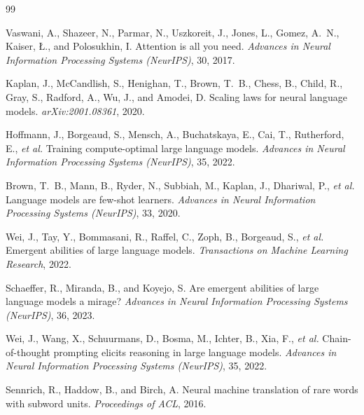 \documentclass[11pt,a4paper]{article}
\theoremstyle{definition}
\theoremstyle{plain}
\begin{document}
\newpage
\begin{thebibliography}{99}

  Vaswani, A., Shazeer, N., Parmar, N., Uszkoreit, J., Jones, L., Gomez, A.\ N.,
  Kaiser, \L., and Polosukhin, I.
  \newblock Attention is all you need.
  \newblock \textit{Advances in Neural Information Processing Systems (NeurIPS)}, 30, 2017.

  Kaplan, J., McCandlish, S., Henighan, T., Brown, T.\ B., Chess, B., Child, R.,
  Gray, S., Radford, A., Wu, J., and Amodei, D.
  \newblock Scaling laws for neural language models.
  \newblock \textit{arXiv:2001.08361}, 2020.

  Hoffmann, J., Borgeaud, S., Mensch, A., Buchatskaya, E., Cai, T., Rutherford, E.,
  \textit{et al.}
  \newblock Training compute-optimal large language models.
  \newblock \textit{Advances in Neural Information Processing Systems (NeurIPS)}, 35, 2022.

  Brown, T.\ B., Mann, B., Ryder, N., Subbiah, M., Kaplan, J., Dhariwal, P.,
  \textit{et al.}
  \newblock Language models are few-shot learners.
  \newblock \textit{Advances in Neural Information Processing Systems (NeurIPS)}, 33, 2020.

  Wei, J., Tay, Y., Bommasani, R., Raffel, C., Zoph, B., Borgeaud, S.,
  \textit{et al.}
  \newblock Emergent abilities of large language models.
  \newblock \textit{Transactions on Machine Learning Research}, 2022.

  Schaeffer, R., Miranda, B., and Koyejo, S.
  \newblock Are emergent abilities of large language models a mirage?
  \newblock \textit{Advances in Neural Information Processing Systems (NeurIPS)}, 36, 2023.

  Wei, J., Wang, X., Schuurmans, D., Bosma, M., Ichter, B., Xia, F.,
  \textit{et al.}
  \newblock Chain-of-thought prompting elicits reasoning in large language models.
  \newblock \textit{Advances in Neural Information Processing Systems (NeurIPS)}, 35, 2022.

  Sennrich, R., Haddow, B., and Birch, A.
  \newblock Neural machine translation of rare words with subword units.
  \newblock \textit{Proceedings of ACL}, 2016.


\end{thebibliography}
\end{document}

